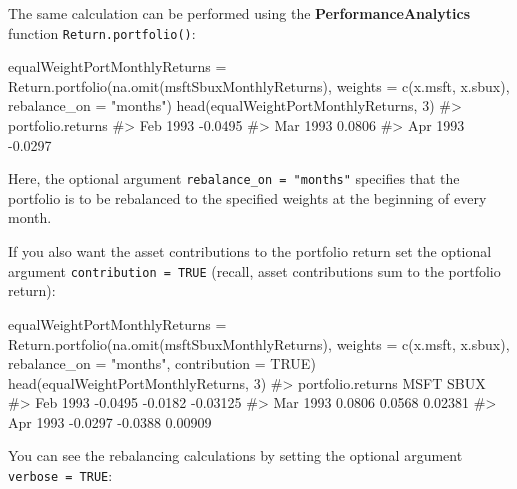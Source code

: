 \documentclass[
  letterpaper,
  DIV=11,
  numbers=noendperiod]{scrreprt}
\newenvironment{Shaded}{\begin{snugshade}}{\end{snugshade}}
\newcommand{\AttributeTok}[1]{\textcolor[rgb]{0.40,0.45,0.13}{#1}}
\newcommand{\CommentTok}[1]{\textcolor[rgb]{0.37,0.37,0.37}{#1}}
\newcommand{\ConstantTok}[1]{\textcolor[rgb]{0.56,0.35,0.01}{#1}}
\newcommand{\DecValTok}[1]{\textcolor[rgb]{0.68,0.00,0.00}{#1}}
\newcommand{\FunctionTok}[1]{\textcolor[rgb]{0.28,0.35,0.67}{#1}}
\newcommand{\NormalTok}[1]{\textcolor[rgb]{0.00,0.23,0.31}{#1}}
\newcommand{\OtherTok}[1]{\textcolor[rgb]{0.00,0.23,0.31}{#1}}
\newcommand{\StringTok}[1]{\textcolor[rgb]{0.13,0.47,0.30}{#1}}
\theoremstyle{definition}
\theoremstyle{definition}
\theoremstyle{remark}
\begin{document}
The same calculation can be performed using the
\textbf{PerformanceAnalytics} function \texttt{Return.portfolio()}:

\begin{Shaded}
\begin{Highlighting}[]
\NormalTok{equalWeightPortMonthlyReturns }\OtherTok{=} 
  \FunctionTok{Return.portfolio}\NormalTok{(}\FunctionTok{na.omit}\NormalTok{(msftSbuxMonthlyReturns), }
                   \AttributeTok{weights =} \FunctionTok{c}\NormalTok{(x.msft, x.sbux),}
                   \AttributeTok{rebalance\_on =} \StringTok{"months"}\NormalTok{)}
\FunctionTok{head}\NormalTok{(equalWeightPortMonthlyReturns, }\DecValTok{3}\NormalTok{)}
\CommentTok{\#\textgreater{}          portfolio.returns}
\CommentTok{\#\textgreater{} Feb 1993           {-}0.0495}
\CommentTok{\#\textgreater{} Mar 1993            0.0806}
\CommentTok{\#\textgreater{} Apr 1993           {-}0.0297}
\end{Highlighting}
\end{Shaded}

Here, the optional argument \texttt{rebalance\_on\ =\ "months"}
specifies that the portfolio is to be rebalanced to the specified
weights at the beginning of every month.

If you also want the asset contributions to the portfolio return set the
optional argument \texttt{contribution\ =\ TRUE} (recall, asset
contributions sum to the portfolio return):

\begin{Shaded}
\begin{Highlighting}[]
\NormalTok{equalWeightPortMonthlyReturns }\OtherTok{=} 
  \FunctionTok{Return.portfolio}\NormalTok{(}\FunctionTok{na.omit}\NormalTok{(msftSbuxMonthlyReturns),}
                   \AttributeTok{weights =} \FunctionTok{c}\NormalTok{(x.msft, x.sbux),}
                   \AttributeTok{rebalance\_on =} \StringTok{"months"}\NormalTok{,}
                   \AttributeTok{contribution =} \ConstantTok{TRUE}\NormalTok{)}
\FunctionTok{head}\NormalTok{(equalWeightPortMonthlyReturns, }\DecValTok{3}\NormalTok{)}
\CommentTok{\#\textgreater{}          portfolio.returns    MSFT     SBUX}
\CommentTok{\#\textgreater{} Feb 1993           {-}0.0495 {-}0.0182 {-}0.03125}
\CommentTok{\#\textgreater{} Mar 1993            0.0806  0.0568  0.02381}
\CommentTok{\#\textgreater{} Apr 1993           {-}0.0297 {-}0.0388  0.00909}
\end{Highlighting}
\end{Shaded}

You can see the rebalancing calculations by setting the optional
argument \texttt{verbose\ =\ TRUE}:
\end{document}
